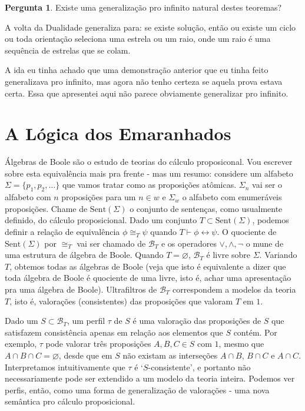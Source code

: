 \documentclass[11pt]{article}
\theoremstyle{definition}
\theoremstyle{definition}
\theoremstyle{definition}
\theoremstyle{definition}
\theoremstyle{definition}
\theoremstyle{definition}
\theoremstyle{definition}
\theoremstyle{definition}
\theoremstyle{definition}
\theoremstyle{definition}
\theoremstyle{definition}
\theoremstyle{definition}
\theoremstyle{definition}
\theoremstyle{definition}
\newtheorem{preguta}{Pergunta}
\newenvironment{pergunta}{
\definecolor{shadecolor}{HTML}{FFF8F0}
\begin{shaded}
\begin{preguta}
}
{
\end{preguta}
\end{shaded}
}
\begin{document}
\begin{pergunta}
  Existe uma generalização pro infinito natural destes teoremas?

  A volta da Dualidade generaliza para: se existe solução, então ou existe um ciclo ou toda orientação seleciona uma estrela ou um raio, onde um raio é uma sequência de estrelas que se colam.

  A ida eu tinha achado que uma demonstração anterior que eu tinha feito generalizava pro infinito, mas agora não tenho certeza se aquela prova estava certa. Essa que apresentei aqui não parece obviamente generalizar pro infinito.
\end{pergunta}





  \section{A Lógica dos Emaranhados}

  Álgebras de Boole são o estudo de teorias do cálculo proposiconal. Vou escrever sobre esta equivalência mais pra frente - mas um resumo: considere um alfabeto $\Sigma = \{p_1,p_2, \dots\}$ que vamos tratar como as proposições atômicas. $\Sigma_n$ vai ser o alfabeto com $n$ proposições para um $n \in w$ e $\Sigma_w$ o alfabeto com enumeráveis proposições. Chame de $\text{Sent}(\Sigma)$ o conjunto de sentenças, como usualmente definido, do cálculo proposicional. Dado um conjunto $T \subset \text{Sent}(\Sigma)$, podemos definir a relação de equivalência $\phi \cong_T \psi$ quando $T \vdash \phi \leftrightarrow \psi$. O quociente de $\text{Sent}(\Sigma)$ por $\cong_T$ vai ser chamado de $\mathcal{B}_T$ e os operadores $\vee,\wedge, \lnot$ o mune de uma estrutura de álgebra de Boole. Quando $T = \varnothing$, $\mathcal{B}_T$ é livre sobre $\Sigma$. Variando $T$, obtemos todas as álgebras de Boole (veja que isto é equivalente a dizer que toda álgebra de Boole é quociente de uma livre, isto é, achar uma apresentação pra uma álgebra de Boole). Ultrafiltros de $\mathcal{B}_T$ correspondem a modelos da teoria $T$, isto é, valorações (consistentes) das proposições que valoram $T$ em $1$.

Dado um $S \subset \mathcal{B}_T$, um perfil $\tau$ de $S$ é uma valoração das proposições de $S$ que satisfazem consistência apenas em relação aos elementos que $S$ contém. Por exemplo, $\tau$ pode valorar três proposições $A,B,C \in S$ com $1$, mesmo que $A \cap B \cap C = \varnothing$, desde que em $S$ não existam as interseções $A \cap B$, $B \cap C$ e $A \cap C$. Interpretamos intuitivamente que $\tau$ é `$S$-consistente', e portanto não necessariamente pode ser extendido a um modelo da teoria inteira. Podemos ver perfis, então, como uma forma de generalização de valorações - uma nova semântica pro cálculo proposicional.
\end{document}
